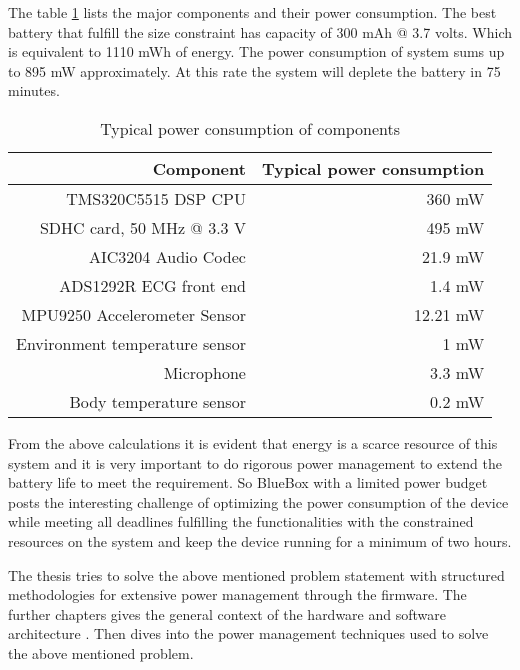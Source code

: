 The table \ref{table:power_rating} lists the major components and their power consumption. The best battery that fulfill the size constraint has capacity of 300 mAh @ 3.7 volts. Which is equivalent to 1110 mWh of energy. The power consumption of system sums up to 895 mW approximately. At this rate the system will deplete the battery in 75 minutes. 
\begin{table}[h]
	\centering
	\begin{tabular}{|r|r|}
		\hline
		Component & Typical power consumption\\
		\hline
		TMS320C5515 DSP CPU &  360 mW \\
		SDHC card, 50 MHz @ 3.3 V   &  495 mW \\
		AIC3204 Audio Codec  &  21.9 mW \\	
		ADS1292R ECG front end & 1.4 mW \\
		MPU9250 Accelerometer Sensor &  12.21 mW \\
		Environment temperature sensor  &  1 mW \\
		Microphone  & 3.3 mW \\
		Body temperature sensor  &  0.2 mW \\	
		\hline
	\end{tabular}
	\caption{Typical power consumption of components}
	\label{table:power_rating}
\end{table}

From the above  calculations it is evident that energy is a scarce resource of this system and it is very important to do rigorous power management to extend the battery life to meet the requirement. So BlueBox with a limited power budget posts the interesting challenge of optimizing the power consumption of the  device while meeting all deadlines fulfilling the functionalities with the constrained resources on the system and keep the device running for a minimum of two hours.

The thesis tries to solve the above mentioned problem statement with structured methodologies for extensive power management through the firmware. The further chapters gives the general context of the hardware and software architecture . Then dives into the power management techniques used to solve the above mentioned problem.


